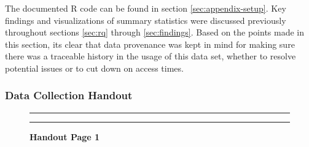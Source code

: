 \documentclass[]{article}
\begin{document}
\vspace{0.25cm}

The documented R code can be found in section \ref{sec:appendix-setup}.
Key findings and visualizations of summary statistics were discussed
previously throughout sections \ref{sec:rq} through \ref{sec:findings}.
Based on the points made in this section, its clear that data provenance
was kept in mind for making sure there was a traceable history in the
usage of this data set, whether to resolve potential issues or to cut
down on access times.

\newpage

\subsubsection{Data Collection Handout}
\label{sec:appendix-data-handout}

\begin{figure}[!ht]
    \hrule
    \caption{ \textbf{Handout Page 1} }
    \begin{center}
    \end{center}
    \label{fig:handout-1}
    \hrule
\end{figure}
\end{document}
